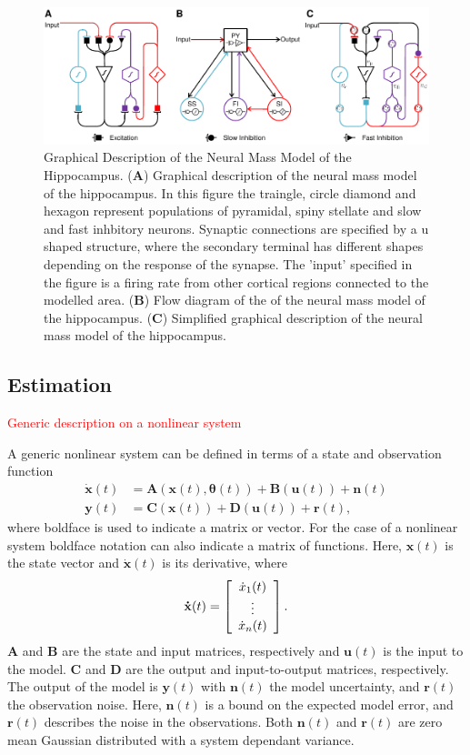\documentclass[10pt]{article}%
\newcommand\red{\textcolor{red}}
\begin{document}
 \begin{figure}
 	\centering
 		\includegraphics{fig/Biological_Model.pdf}
 	\caption{Graphical Description of the Neural Mass Model of the Hippocampus. (\textbf{A}) Graphical description of the neural mass model of the hippocampus. In this figure the traingle, circle diamond and hexagon represent populations of pyramidal, spiny stellate and slow and fast inhbitory neurons. Synaptic connections are specified by a u shaped structure, where the secondary terminal has different shapes depending on the response of the synapse. The 'input' specified in the figure is a firing rate from other cortical regions connected to the modelled area. (\textbf{B}) Flow diagram of the of the neural mass model of the hippocampus. (\textbf{C}) Simplified graphical description of the neural mass model of the hippocampus.}
 	\label{fig: Biological}
 \end{figure}


\subsection{Estimation}

\red{Generic description on a nonlinear system}

A generic nonlinear system can be defined in terms of a state and observation function \begin{align}
\label{eqn: NonlinEstS}
\mathbf{\dot{x}}(t) &= \mathbf{A}(\mathbf{x}(t),\mathbf{\theta}(t)) + \mathbf{B}(\mathbf{u}(t)) + \mathbf{n}(t)\\
\label{eqn: NonlinEstO}
\mathbf{y}(t)  &= \mathbf{C}(\mathbf{x}(t)) +\mathbf{D}(\mathbf{u}(t))+\mathbf{r}(t),
\end{align} where boldface is used to indicate a matrix or vector. For the case of a nonlinear system boldface notation can also indicate a matrix of functions. Here, $\mathbf{x}(t)$ is the state vector and $\dot{\mathbf{x}}(t)$ is its derivative, where
\[ \mathbf{\dot{x}}(t) = \left[ \begin{array}[pos]{c}
\dot{x}_{1}(t)\\
\vdots \\
\dot{x}_{n}(t) \end{array} \right] .\] $\mathbf{A}$ and $\mathbf{B}$ are the state and input matrices, respectively and $\mathbf{u}(t)$ is the input to the model. $\mathbf{C}$ and $\mathbf{D}$ are the output and input-to-output matrices, respectively. The output of the model is $\mathbf{y}(t)$ with $\mathbf{n}(t)$ the model uncertainty, and $\mathbf{r}(t)$ the observation noise. Here, $\mathbf{n}(t)$ is a bound on the expected model error, and $\mathbf{r}(t)$ describes the noise in the observations. Both $\mathbf{n}(t)$ and $\mathbf{r}(t)$ are zero mean Gaussian distributed with a system dependant variance. 
\end{document}
